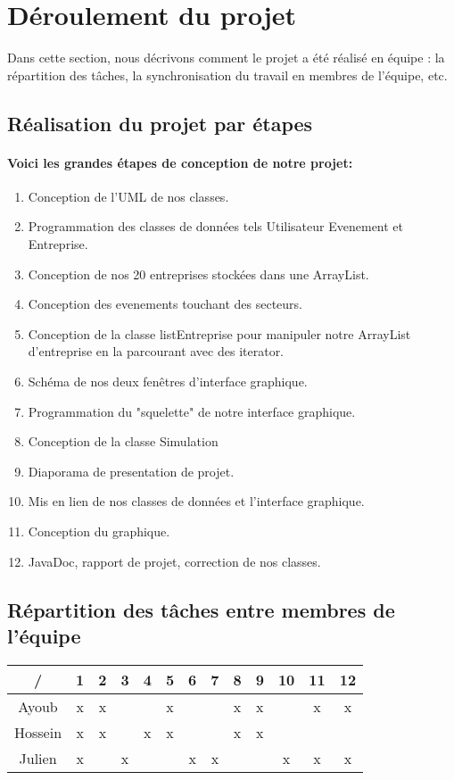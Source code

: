 \newpage
\section{Déroulement du projet}
\label{sec:deroulement}

Dans cette section, nous décrivons comment le projet a été réalisé en équipe : la répartition des tâches, la synchronisation du travail en membres de l'équipe, etc.

\subsection{Réalisation du projet par étapes}
\paragraph{Voici les grandes étapes de conception de notre projet:}
\begin{enumerate}
\item Conception de l'UML de nos classes.
\item Programmation des classes de données tels Utilisateur Evenement et Entreprise.
\item Conception de nos 20 entreprises stockées dans une ArrayList.
\item Conception des evenements touchant des secteurs.
\item Conception de la classe listEntreprise pour manipuler notre ArrayList d'entreprise en la parcourant avec des iterator.
\item Schéma de nos deux fenêtres d'interface graphique.
\item Programmation du "squelette" de notre interface graphique.
\item Conception de la classe Simulation
\item Diaporama de presentation de projet.
\item  Mis en lien de nos classes de données et l'interface graphique.
\item Conception du graphique.
\item JavaDoc, rapport de projet, correction de nos classes.

\end{enumerate}

\subsection{Répartition des tâches entre membres de l'équipe}

\begin{tabular}{|*{13}{c|}}
    \hline
     / & 1 & 2  & 3  & 4  & 5  & 6  & 7  & 8  & 9  & 10 & 11 & 12 \\
    \hline
     Ayoub  & x  & x  &   &  & x &  &  & x & x &  & x & x\\
    \hline
     Hossein  & x  & x  &  & x & x &  &  & x & x &  &  &  \\
    \hline
     Julien  & x  &  & x &  &  & x & x &  &  & x & x & x \\
    \hline
\end{tabular}
